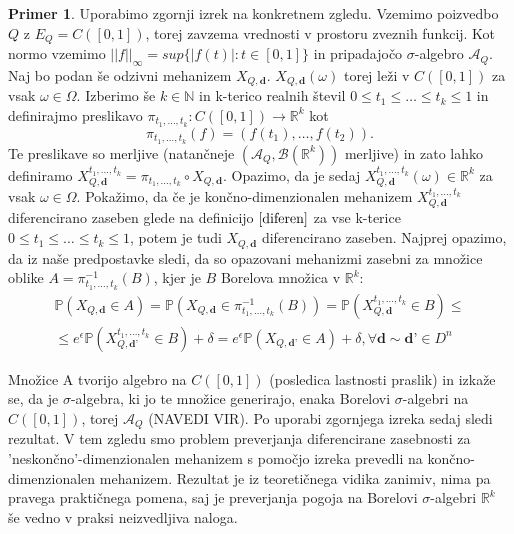 \documentclass[12pt,a4paper]{amsart}
\theoremstyle{definition} %
\newtheorem{primer}[definicija]{Primer}
\theoremstyle{plain} %
\begin{document}
\begin{primer}
Uporabimo zgornji izrek na konkretnem zgledu. Vzemimo poizvedbo $Q$ z $E_Q = C([0,1])$, torej zavzema vrednosti v prostoru zveznih funkcij. Kot normo vzemimo $||f||_\infty = sup\{|f(t)| : t \in [0,1]\}$ in pripadajočo $\sigma$-algebro $\mathcal{A}_Q$. Naj bo podan še odzivni mehanizem $X_{Q,\textbf{d}}$. $X_{Q,\textbf{d}}(\omega)$ torej leži v $C([0,1])$ za vsak $\omega \in \Omega$.
\newline
Izberimo še $k \in \mathbb{N}$ in k-terico realnih števil $0 \leq t_1 \leq \ldots \leq t_k \leq 1$ in definirajmo preslikavo $ \pi _{t_1,\ldots,t_k}: C([0,1]) \rightarrow \mathbb{R}^k$ kot $$\pi _{t_1,\ldots,t_k}(f) = (f(t_1),\ldots,f(t_2)).$$ Te preslikave so merljive (natančneje $(\mathcal{A}_Q, \mathcal{B}(\mathbb{R}^k))$ merljive) in zato lahko definiramo $X_{Q,\textbf{d}}^{t_1,\ldots,t_k} = \pi _{t_1,\ldots,t_k} \circ X_{Q,\textbf{d}}$. Opazimo, da je sedaj $X_{Q,\textbf{d}}^{t_1,\ldots,t_k} (\omega) \in \mathbb{R}^k$ za vsak $\omega \in \Omega$. Pokažimo, da če je končno-dimenzionalen mehanizem $X_{Q,\textbf{d}}^{t_1,\ldots,t_k}$ diferencirano zaseben glede na definicijo $\eqref{diferen}$ za vse k-terice $0 \leq t_1 \leq \ldots \leq t_k \leq 1$, potem je tudi $X_{Q,\textbf{d}}$ diferencirano zaseben. Najprej opazimo, da iz naše predpostavke sledi, da so opazovani mehanizmi zasebni za množice oblike $A = \pi _{t_1,\ldots,t_k}^{-1}(B)$, kjer je $B$ Borelova množica v $\mathbb{R}^k$: 
\begin{gather*}
\mathbb{P}(X_{Q,\textbf{d}} \in A) =  \mathbb{P}(X_{Q,\textbf{d}} \in \pi _{t_1,\ldots,t_k}^{-1}(B)) = \mathbb{P}(X_{Q,\textbf{d}}^{t_1,\ldots,t_k} \in B) \leq \\
 \leq e^{\epsilon}\mathbb{P}(X_{Q,\textbf{d'}}^{t_1,\ldots,t_k} \in B) + \delta = e^{\epsilon}\mathbb{P}(X_{Q,\textbf{d'}} \in A) + \delta, \forall \textbf{d} \sim \textbf{d'} \in D^n
\end{gather*}


Množice A tvorijo algebro na $C([0,1])$ (posledica lastnosti praslik) in izkaže se, da je $\sigma$-algebra, ki jo te množice generirajo, enaka  Borelovi $\sigma$-algebri na $C([0,1])$, torej $\mathcal{A}_Q$ (NAVEDI VIR). Po uporabi zgornjega izreka sedaj sledi rezultat.
\newline
\newline
V tem zgledu smo problem preverjanja diferencirane zasebnosti za 'neskončno'-dimenzionalen mehanizem s pomočjo izreka prevedli na končno-dimenzionalen mehanizem. Rezultat je iz teoretičnega vidika zanimiv, nima pa pravega praktičnega pomena, saj je preverjanja pogoja na Borelovi $\sigma$-algebri $\mathbb{R}^k$ še vedno v praksi neizvedljiva naloga.
\end{primer}
\end{document}

